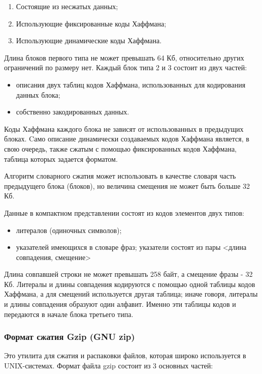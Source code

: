 \documentclass[12pt]{article}
\begin{document}
\begin{enumerate}
    \item Состоящие из несжатых данных;
    \item Использующие фиксированные коды Хаффмана;
    \item Использующие динамические коды Хаффмана.
\end{enumerate}

Длина блоков первого типа не может превышать 64 Кб, относительно других ограничений по размеру нет. Каждый блок типа 2 и 3 состоит из двух частей:

\begin{itemize}[label=-]
    \item описания двух таблиц кодов Хаффмана, использованных для кодирования данных блока;
    \item собственно закодированных данных.
\end{itemize}

Коды Хаффмана каждого блока не зависят от использованных в предыдущих блоках.
Cамо описание динамически создаваемых кодов Хаффмана является, в свою очередь,
также сжатым с помощью фиксированных кодов Хаффмана, таблица которых задается форматом.

Алгоритм словарного сжатия может использовать в качестве словаря часть предыдущего блока
(блоков), но величина смещения не может быть больше 32 Кб.

Данные в компактном представлении состоят из кодов элементов двух типов:

\begin{itemize}[label=-]
    \item литералов (одиночных символов);
    \item указателей имеющихся в словаре фраз; указатели состоят из пары
          <длина совпадения, смещение>
\end{itemize}

Длина совпавшей строки не может превышать 258 байт, а смещение фразы - 32 Кб.
Литералы и длины совпадения кодируются с помощью одной таблицы кодов Хаффмана,
а для смещений используется другая таблица; иначе говоря,
литералы и длины совпадения образуют один алфавит.
Именно эти таблицы кодов и передаются в начале блока третьего типа.

\subsubsection{Формат сжатия Gzip (GNU zip)}

Это утилита для сжатия и распаковки файлов, которая широко используется в UNIX-системах.
Формат файла gzip состоит из 3 основных частей:
\end{document}
